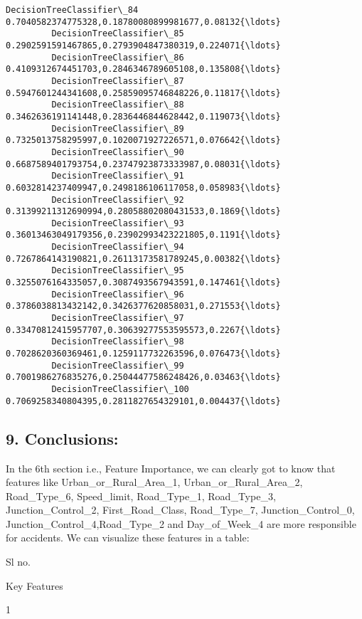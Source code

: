 \documentclass[11pt]{article}
\begin{document}
\begin{Verbatim}[commandchars=\\\{\}]
         DecisionTreeClassifier\_84   0.7040582374775328,0.18780080899981677,0.08132{\ldots}  
         DecisionTreeClassifier\_85   0.2902591591467865,0.2793904847380319,0.224071{\ldots}  
         DecisionTreeClassifier\_86   0.4109312674451703,0.2846346789605108,0.135808{\ldots}  
         DecisionTreeClassifier\_87   0.5947601244341608,0.25859095746848226,0.11817{\ldots}  
         DecisionTreeClassifier\_88   0.3462636191141448,0.2836446844628442,0.119073{\ldots}  
         DecisionTreeClassifier\_89   0.7325013758295997,0.1020071927226571,0.076642{\ldots}  
         DecisionTreeClassifier\_90   0.6687589401793754,0.23747923873333987,0.08031{\ldots}  
         DecisionTreeClassifier\_91   0.6032814237409947,0.2498186106117058,0.058983{\ldots}  
         DecisionTreeClassifier\_92   0.31399211312690994,0.28058802080431533,0.1869{\ldots}  
         DecisionTreeClassifier\_93   0.36013463049179356,0.23902993423221805,0.1191{\ldots}  
         DecisionTreeClassifier\_94   0.7267864143190821,0.26113173581789245,0.00382{\ldots}  
         DecisionTreeClassifier\_95   0.3255076164335057,0.3087493567943591,0.147461{\ldots}  
         DecisionTreeClassifier\_96   0.3786038813432142,0.3426377620858031,0.271553{\ldots}  
         DecisionTreeClassifier\_97   0.33470812415957707,0.30639277553595573,0.2267{\ldots}  
         DecisionTreeClassifier\_98   0.7028620360369461,0.1259117732263596,0.076473{\ldots}  
         DecisionTreeClassifier\_99   0.7001986276835276,0.25044477586248426,0.03463{\ldots}  
         DecisionTreeClassifier\_100  0.7069258340804395,0.2811827654329101,0.004437{\ldots}  
\end{Verbatim}
            
    \hypertarget{conclusions}{%
\subsection{9. Conclusions:}\label{conclusions}}

In the 6th section i.e., Feature Importance, we can clearly got to know
that features like Urban\_or\_Rural\_Area\_1, Urban\_or\_Rural\_Area\_2,
Road\_Type\_6, Speed\_limit, Road\_Type\_1, Road\_Type\_3,
Junction\_Control\_2, First\_Road\_Class, Road\_Type\_7,
Junction\_Control\_0, Junction\_Control\_4,Road\_Type\_2 and
Day\_of\_Week\_4 are more responsible for accidents. We can visualize
these features in a table:

Sl no.

Key Features

1
\end{document}
